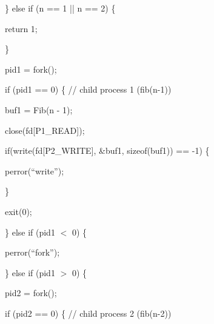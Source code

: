 \documentclass[a4paper,portrait,12pt]{article}
\begin{document}
\begin{flushleft}
\} else if (n == 1 || n == 2) \{
\end{flushleft}


\begin{flushleft}
return 1;
\end{flushleft}


\}


\begin{flushleft}
pid1 = fork();
\end{flushleft}


\begin{flushleft}
if (pid1 == 0) \{ // child process 1 (fib(n-1))
\end{flushleft}


\begin{flushleft}
buf1 = Fib(n - 1);
\end{flushleft}


\begin{flushleft}
close(fd[P1\_READ]);
\end{flushleft}


\begin{flushleft}
if(write(fd[P2\_WRITE], \&buf1, sizeof(buf1)) == -1) \{
\end{flushleft}


\begin{flushleft}
perror({``}write'');
\end{flushleft}


\}


\begin{flushleft}
exit(0);
\end{flushleft}


\begin{flushleft}
\} else if (pid1 $<$ 0) \{
\end{flushleft}


\begin{flushleft}
perror({``}fork'');
\end{flushleft}


\begin{flushleft}
\} else if (pid1 $>$ 0) \{
\end{flushleft}


\begin{flushleft}
pid2 = fork();
\end{flushleft}


\begin{flushleft}
if (pid2 == 0) \{ // child process 2 (fib(n-2))
\end{flushleft}
\end{document}
